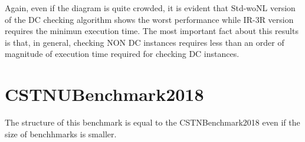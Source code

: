 \documentclass[a4paper,11pt]{article}
\begin{document}
Again, even if the diagram is quite crowded, it is evident that \textrm{Std-woNL} version of the DC checking algorithm shows the worst performance while
\textrm{IR-3R} version requires the minimun execution time. The most important fact about this results is that, in general, checking NON DC instances requires 
less than an order of magnitude of execution time required for checking DC instances. 




\section{CSTNUBenchmark2018}

The structure of this benchmark is equal to the CSTNBenchmark2018 even if the size of benchhmarks is smaller.
\end{document}
